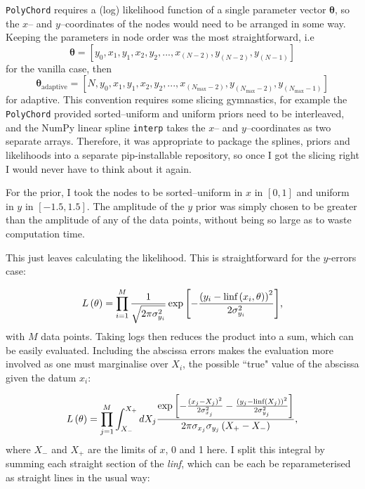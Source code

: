 \documentclass{article}
\begin{document}
\texttt{PolyChord} requires a (log) likelihood function of a single parameter vector $\mathbf{\theta}$, so the $x$-- and $y$--coordinates of the nodes would need to be arranged in some way. Keeping the parameters in node order was the most straightforward, i.e $$\bm\theta = [y_0, x_1, y_1, x_2, y_2, ..., x_{(N-2)}, y_{(N-2)}, y_{(N-1)}]$$for the vanilla case, then $$\bm\theta_\textrm{adaptive} = [N, y_0, x_1, y_1, x_2, y_2, ..., x_{(N_\textrm{max}-2)}, y_{(N_\textrm{max}-2)}, y_{(N_\textrm{max}-1)}]$$ for adaptive. This convention requires some slicing gymnastics, for example the \texttt{PolyChord} provided sorted--uniform and uniform priors need to be interleaved, and the NumPy linear spline \texttt{interp} takes the $x$-- and $y$--coordinates as two separate arrays. Therefore, it was appropriate to package the splines, priors and likelihoods into a separate pip-installable repository, so once I got the slicing right I would never have to think about it again.

For the prior, I took the nodes to be sorted--uniform in $x$ in $\left[0, 1\right]$ and uniform in $y$ in $\left[-1.5, 1.5\right]$. The amplitude of the $y$ prior was simply chosen to be greater than the amplitude of any of the data points, without being so large as to waste computation time. 

This just leaves calculating the likelihood. This is straightforward for the $y$-errors case:

\begin{equation}
  L\left(\mathbf{\theta}\right) = \prod_{i=1}^{M}\frac{1}{\sqrt{2\pi\sigma_{y_i}^2}}\exp{\left[-\frac{\left(y_i-\textrm{linf}\left(x_i, \mathbf{\theta}\right)\right)^2}{2\sigma_{y_i}^2}\right]}\textrm,
\end{equation}
%
with $M$ data points. Taking logs then reduces the product into a sum, which can be easily evaluated. Including the abscissa errors makes the evaluation more involved as one must marginalise over $X_i$, the possible ``true" value of the abscissa given the datum $x_i$: 

\begin{equation}
  L\left(\mathbf{\theta}\right)= \prod_{j=1}^{M}\int_{X_-}^{X_+}dX_j\frac{\exp{\left[-\frac{\left(x_j-X_j\right)^2}{2\sigma_{x_j}^2} -\frac{\left(y_j-\textrm{linf}\left(X_j\right)\right)^2}{2\sigma_{y_j}^2}\right]}}{2\pi\sigma_{x_j}\sigma_{y_j}\left(X_+-X_-\right)}\textrm,
\end{equation}
%
where $X_-$ and $X_+$ are the limits of $x$, 0 and 1 here. I split this integral by summing each straight section of the \textit{linf}, which can be each be reparameterised as straight lines in the usual way:
\end{document}
